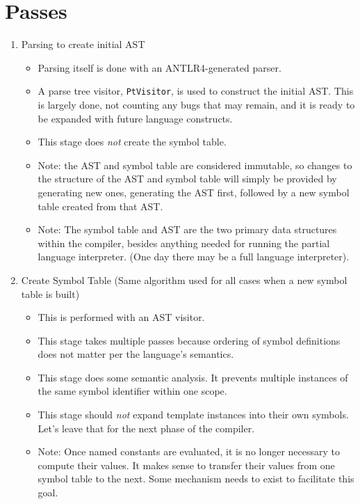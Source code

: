 \documentclass{article}
\begin{document}
\section{Passes}
	\begin{enumerate}
	\item Parsing to create initial AST
		\begin{itemize}
		\item Parsing itself is done with an ANTLR4-generated parser.
		\item A parse tree visitor, \texttt{PtVisitor}, is used to
		construct the initial AST.  This is largely done, not counting any
		bugs that may remain, and it is ready to be expanded with future
		language constructs.
		\item This stage does \textit{not} create the symbol table.
		\item Note:  the AST and symbol table are considered immutable, so
		changes to the structure of the AST and symbol table will simply be
		provided by generating new ones, generating the AST first, followed
		by a new symbol table created from that AST.
		\item Note:  The symbol table and AST are the two primary data
		structures within the compiler, besides anything needed for running
		the partial language interpreter.  (One day there may be a full
		language interpreter).
		\end{itemize}
	\item Create Symbol Table (Same algorithm used for all cases when a new
	symbol table is built)
		\begin{itemize}
		\item This is performed with an AST visitor.
		\item This stage takes multiple passes because ordering of symbol
		definitions does not matter per the language's semantics.
		\item This stage does some semantic analysis.  It prevents
		multiple instances of the same symbol identifier within one scope.
		\item This stage should \textit{not} expand template instances into
		their own symbols.  Let's leave that for the next phase of the
		compiler.
		\item Note:  Once named constants are evaluated, it is no longer
		necessary to compute their values.  It makes sense to transfer
		their values from one symbol table to the next.  Some mechanism
		needs to exist to facilitate this goal.

\end{itemize}
\end{enumerate}
\end{document}
